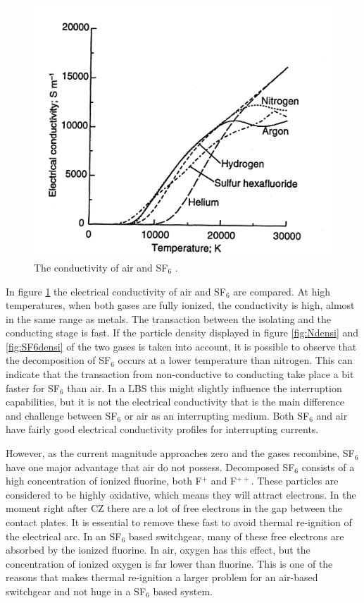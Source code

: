 \documentclass[10pt,a4paper,twoside]{article}
\begin{document}
\begin{figure}[H]
\centering
\includegraphics[scale=1]{Bilder/Discussion/conductSF6AndAIR.png}
\caption{The conductivity of air and SF${_6}$ \cite{bib:THFD}.} \label{fig:AirandSF6ConComp}
\end{figure}

In figure \ref{fig:AirandSF6ConComp} the electrical conductivity of air and SF$_6$ are compared. At high temperatures, when both gases are fully ionized, the conductivity is high, almost in the same range as metals. The transaction between the isolating and the conducting stage is fast. If the particle density displayed in figure \ref{fig:Ndensi} and \ref{fig:SF6densi} of the two gases is taken into account, it is possible to observe that the decomposition of SF$_6$ occurs at a lower temperature than nitrogen. This can indicate that the transaction from non-conductive to conducting take place a bit faster for SF$_6$ than air. In a LBS this might slightly influence the interruption capabilities, but it is not the electrical conductivity that is the main difference and challenge between SF$_6$ or air as an interrupting medium. Both SF$_6$ and air have fairly good electrical conductivity profiles for interrupting currents.

However, as the current magnitude approaches zero and the gases recombine, SF$_6$ have one major advantage that air do not possess. Decomposed SF$_6$ consists of a high concentration of ionized fluorine, both F$^{+}$ and F$^{++}$. These particles are considered to be highly oxidative, which means they will attract electrons. In the moment right after CZ there are a lot of free electrons in the gap between the contact plates. It is essential to remove these fast to avoid thermal re-ignition of the electrical arc. In an SF$_6$ based switchgear, many of these free electrons are absorbed by the ionized fluorine. In air, oxygen has this effect, but the concentration of ionized oxygen is far lower than fluorine. This is one of the reasons that makes thermal re-ignition a larger problem for an air-based switchgear and not huge in a SF$_6$ based system.
\end{document}
